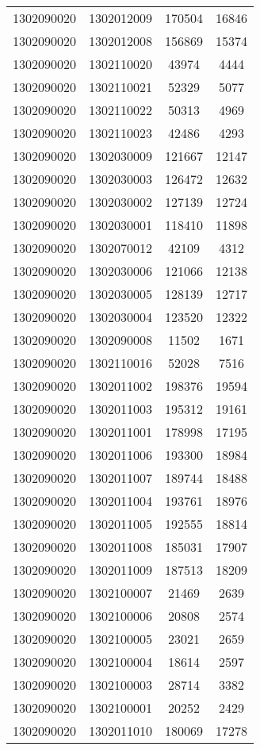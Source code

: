 \begin{longtable}{llcc}
1302090020 & 1302012009 & 170504 & 16846\\
1302090020 & 1302012008 & 156869 & 15374\\
1302090020 & 1302110020 & 43974 & 4444\\
1302090020 & 1302110021 & 52329 & 5077\\
1302090020 & 1302110022 & 50313 & 4969\\
1302090020 & 1302110023 & 42486 & 4293\\
1302090020 & 1302030009 & 121667 & 12147\\
1302090020 & 1302030003 & 126472 & 12632\\
1302090020 & 1302030002 & 127139 & 12724\\
1302090020 & 1302030001 & 118410 & 11898\\
1302090020 & 1302070012 & 42109 & 4312\\
1302090020 & 1302030006 & 121066 & 12138\\
1302090020 & 1302030005 & 128139 & 12717\\
1302090020 & 1302030004 & 123520 & 12322\\
1302090020 & 1302090008 & 11502 & 1671\\
1302090020 & 1302110016 & 52028 & 7516\\
1302090020 & 1302011002 & 198376 & 19594\\
1302090020 & 1302011003 & 195312 & 19161\\
1302090020 & 1302011001 & 178998 & 17195\\
1302090020 & 1302011006 & 193300 & 18984\\
1302090020 & 1302011007 & 189744 & 18488\\
1302090020 & 1302011004 & 193761 & 18976\\
1302090020 & 1302011005 & 192555 & 18814\\
1302090020 & 1302011008 & 185031 & 17907\\
1302090020 & 1302011009 & 187513 & 18209\\
1302090020 & 1302100007 & 21469 & 2639\\
1302090020 & 1302100006 & 20808 & 2574\\
1302090020 & 1302100005 & 23021 & 2659\\
1302090020 & 1302100004 & 18614 & 2597\\
1302090020 & 1302100003 & 28714 & 3382\\
1302090020 & 1302100001 & 20252 & 2429\\
1302090020 & 1302011010 & 180069 & 17278\\

\end{longtable}
